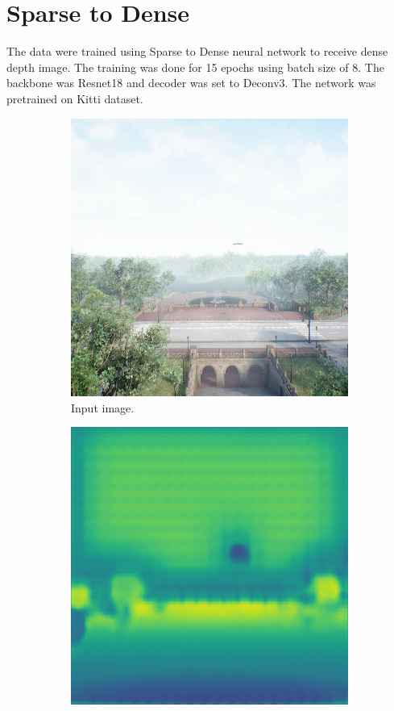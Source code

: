 \documentclass[twoside]{ctuthesis}
\theoremstyle{plain}
\theoremstyle{definition}
\theoremstyle{note}
\begin{document}
\section{Sparse to Dense}
The data were trained using Sparse to Dense neural network to receive dense depth image. The training was done for 15 epochs using batch size of 8. The backbone was Resnet18 and decoder was set to Deconv3. The network was pretrained on Kitti dataset.
\begin{figure}
	\centering
	\begin{subfigure}[b]{0.4\textwidth}
		\centering
		\includegraphics[width=\textwidth]{s2d_input.png}
		\caption{Input image.}
	\end{subfigure}
	\hfill
	\begin{subfigure}[b]{0.4\textwidth}
		\centering
		\includegraphics[width=\textwidth]{s2d_output.png}

\end{subfigure}
\end{figure}
\end{document}
